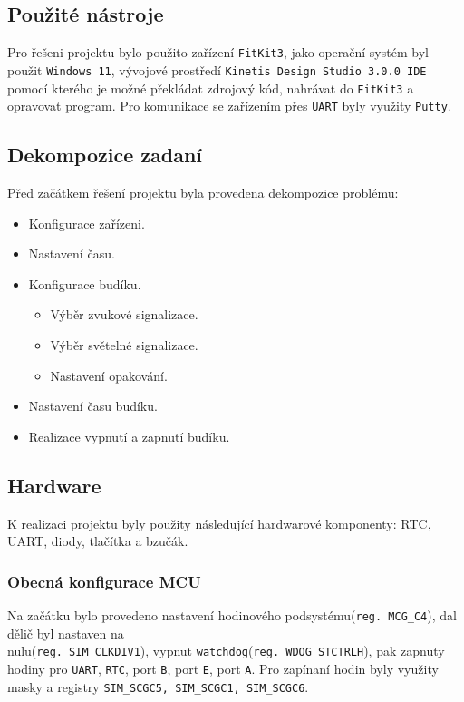 \documentclass[a4paper,11pt]{article}
\begin{document}
\subsection{Použité nástroje}
Pro řešeni projektu bylo použito zařízení \texttt{FitKit3}, jako operační systém byl použit \texttt{Windows 11}, vývojové prostředí \texttt{Kinetis Design Studio 3.0.0 IDE} pomocí kterého je možné překládat zdrojový kód, nahrávat do \texttt{FitKit3} a opravovat program. Pro komunikace se zařízením přes \texttt{UART} byly využity \texttt{Putty}. 

\subsection{Dekompozice zadaní}
\label{sec:dek}
Před začátkem řešení projektu byla provedena dekompozice problému:
\begin{itemize}
    \item Konfigurace zařízeni.
    \item Nastavení času.
    \item Konfigurace budíku.
    \begin{itemize}
        \item Výběr zvukové signalizace.
        \item Výběr světelné signalizace.
        \item Nastavení opakování.
    \end{itemize}
    \item Nastavení času budíku.
    \item Realizace vypnutí a zapnutí budíku.
\end{itemize}
\subsection{Hardware}
K realizaci projektu byly použity následující hardwarové komponenty: RTC, UART, diody, tlačítka a bzučák.
\subsubsection{Obecná konfigurace MCU}
Na začátku bylo provedeno nastavení hodinového podsystému(\texttt{reg. MCG\_C4}), dal dělič byl nastaven na \\nulu(\texttt{reg. SIM\_CLKDIV1}), vypnut \texttt{watchdog}(\texttt{reg. WDOG\_STCTRLH}), pak zapnuty hodiny pro \texttt{UART}, \texttt{RTC}, port \texttt{B}, port \texttt{E}, port \texttt{A}. Pro zapínaní hodin byly využity masky a registry \texttt{SIM\_SCGC5,  SIM\_SCGC1,  SIM\_SCGC6}.
\end{document}
